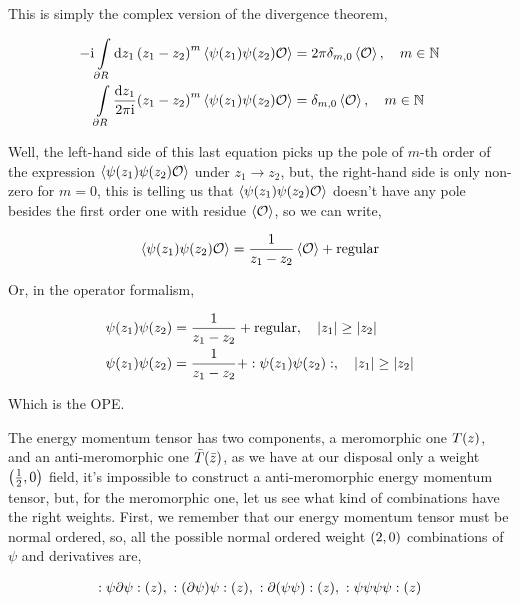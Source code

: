 This is simply the complex version of the divergence theorem,

\begin{align*}
    -\textnormal{i}\int\limits_{\partial R}\dd{z_1}\qty(z_1-z_2)^m\expval{\psi\qty(z_1)\psi\qty(z_2)\mathcal O}&=2\pi\delta_{m,0}\expval{\mathcal O},\ \ \ m\in\mathbb N\\
    \int\limits_{\partial R}\frac{\dd{z_1}}{2\pi\textnormal{i}}\qty(z_1-z_2)^m\expval{\psi\qty(z_1)\psi\qty(z_2)\mathcal O}&=\delta_{m,0}\expval{\mathcal O},\ \ \ m\in\mathbb N
\end{align*}

Well, the left-hand side of this last equation picks up the pole of $m$-th order of the expression $\expval{\psi\qty(z_1)\psi\qty(z_2)\mathcal O}$ under $z_1\rightarrow z_2$, but, 
the right-hand side is only non-zero for $m=0$, this is telling us that $\expval{\psi\qty(z_1)\psi\qty(z_2)\mathcal O}$ doesn't have any pole besides the first order one with residue $\expval{\mathcal O}$, 
so we can write,

\begin{align*}
    \expval{\psi\qty(z_1)\psi\qty(z_2)\mathcal O}=\frac{1}{z_1-z_2}\expval{\mathcal O}+\textnormal{regular}
\end{align*}

Or, in the operator formalism,

\begin{align*}
    \psi\qty(z_1)\psi\qty(z_2)&=\frac{1}{z_1-z_2}+\textnormal{regular},\ \ \ \abs{z_1}\geq \abs{z_2}\\
    \psi\qty(z_1)\psi\qty(z_2)&=\frac{1}{z_1-z_2}+\cnord{\psi\qty(z_1)\psi\qty(z_2)},\ \ \ \abs{z_1}\geq \abs{z_2}
\end{align*}

Which is the OPE.

\probitem{}

The energy momentum tensor has two components, a meromorphic one $T\qty(z)$, and an anti-meromorphic one $\bar T\qty(\bar z)$, 
as we have at our disposal only a weight $\qty(\frac12,0)$ field, it's impossible to construct a anti-meromorphic energy momentum tensor, 
but, for the meromorphic one, let us see what kind of combinations have the right weights. First, we remember that our energy momentum tensor 
must be normal ordered, so, all the possible normal ordered weight $\qty(2,0)$ combinations of $\psi$ and derivatives are,

\begin{align*}
    \cnord{\psi\partial\psi}\qty(z),\ \cnord{(\partial\psi)\psi}\qty(z), \ \cnord{\partial\qty(\psi\psi)}\qty(z),\ \cnord{\psi\psi\psi\psi}\qty(z)
\end{align*} 

